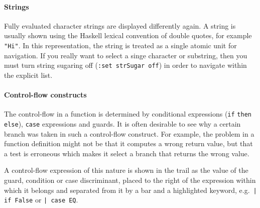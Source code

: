 \documentclass[12pt]{article}
\newcommand{\com}[1]{\texttt{#1}}
\begin{document}
\paragraph{Strings}
Fully evaluated character strings are displayed differently again.
A string is usually shown using the Haskell lexical convention of
double quotes, for example \texttt{"Hi"}.  In this representation,
the string is treated as a single atomic unit for navigation.  If
you really want to select a singe character or substring, then
you must turn string sugaring off (\com{:set strSugar off}) in
order to navigate within the explicit list.




\paragraph{Control-flow constructs}

The control-flow in a function is determined by conditional expressions
(\texttt{if} \texttt{then} \texttt{else}), \texttt{case} expressions
and guards.  It is often desirable to see why a certain branch was
taken in such a control-flow construct. For example, the problem in
a function definition might not be that it computes a wrong return
value, but that a test is erroneous which makes it select a branch
that returns the wrong value.

A control-flow expression of this nature is shown in the trail as
the value of the guard, condition or case discriminant, placed to
the right of the expression within which it belongs and separated
from it by a bar and a highlighted keyword, e.g.\ \texttt{| if False}
or \texttt{| case EQ}.
\end{document}
